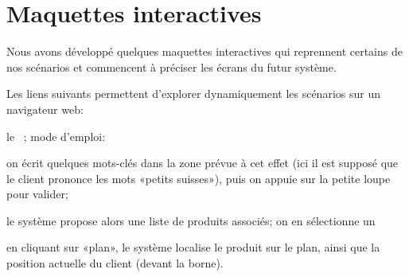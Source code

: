 \chapter{Maquettes interactives}

Nous avons développé quelques maquettes interactives qui reprennent certains de nos scénarios et commencent à préciser les écrans du futur système.


Les liens suivants permettent d'explorer dynamiquement les scénarios sur un navigateur web:
\startitemize
\item le \cu\ \from[BE]; mode d'emploi:
    \startitemize[n]
    \item on écrit quelques mots-clés dans la zone prévue à cet effet (ici il est supposé que le client prononce les mots «petits suisses»), puis on appuie sur la petite loupe pour valider;
    \item le système propose alors une liste de produits associés; on en sélectionne un
    \item en cliquant sur «plan», le système localise le produit sur le plan, ainsi que la position actuelle du client (devant la borne).
    \stopitemize
\stopitemize
